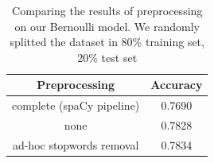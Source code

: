 \begin{table}[h!t]
    \centering
    \caption{Comparing the results of preprocessing on our Bernoulli model. We randomly splitted the dataset in 80\% training set, 20\% test set}
    \label{tab:versus_metrics}
    \begin{tabular}{c|c}
        \hline
        Preprocessing & Accuracy \\
        \hline 
        complete (spaCy pipeline) & 0.7690 \\ 
        none & 0.7828 \\ 
        ad-hoc stopwords removal & 0.7834 \\ 
        \hline
    \end{tabular}
\end{table}
